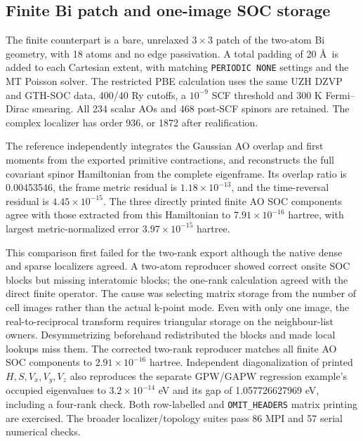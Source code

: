 \documentclass[11pt]{article}
\begin{document}
\subsection{Finite Bi patch and one-image SOC storage}
The finite counterpart is a bare, unrelaxed $3\times3$ patch of the
two-atom Bi geometry, with 18 atoms and no edge passivation. A total
padding of 20 \AA\ is added to each Cartesian extent, with matching
\texttt{PERIODIC NONE} settings and the MT Poisson solver. The
restricted PBE calculation uses the same UZH DZVP and GTH-SOC data,
400/40 Ry cutoffs, a $10^{-9}$ SCF threshold and 300 K Fermi--Dirac
smearing. All 234 scalar AOs and 468 post-SCF spinors are retained.
The complex localizer has order 936, or 1872 after realification.

The reference independently integrates the Gaussian AO overlap and
first moments from the exported primitive contractions, and
reconstructs the full covariant spinor Hamiltonian from the complete
eigenframe. Its overlap ratio is 0.00453546, the frame metric
residual is $1.18\times10^{-13}$, and the time-reversal residual is
$4.45\times10^{-15}$. The three directly printed finite AO SOC
components agree with those extracted from this Hamiltonian to
$7.91\times10^{-16}$ hartree, with largest metric-normalized
error $3.97\times10^{-15}$ hartree.

This comparison first failed for the two-rank export although the
native dense and sparse localizers agreed. A two-atom reproducer
showed correct onsite SOC blocks but missing interatomic blocks;
the one-rank calculation agreed with the direct finite operator.
The cause was selecting matrix storage from the number of cell
images rather than the actual k-point mode. Even with only one
image, the real-to-reciprocal transform requires triangular storage
on the neighbour-list owners. Desymmetrizing beforehand redistributed
the blocks and made local lookups miss them. The corrected two-rank
reproducer matches all finite AO SOC components to
$2.91\times10^{-16}$ hartree. Independent diagonalization of printed
$H,S,V_x,V_y,V_z$ also reproduces the separate GPW/GAPW regression
example's occupied eigenvalues to $3.2\times10^{-14}$ eV and its
gap of 1.057726627969 eV, including a four-rank check. Both row-labelled
and \texttt{OMIT\_HEADERS} matrix printing are exercised. The broader
localizer/topology suites pass 86 MPI and 57 serial numerical checks.
\end{document}
